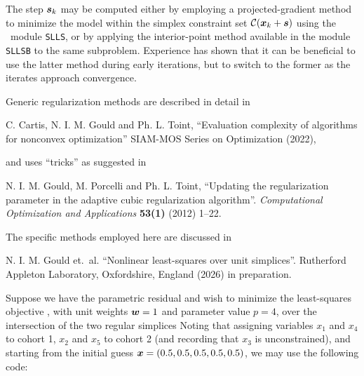 \documentclass{galahad}
\begin{document}
The step ${\bm{s}}_k$ may be computed either by employing a projected-gradient
method to minimize the model within the simplex constraint set 
$\calC(\bmx_k+\bms)$ using the \galahad\ module {\tt SLLS}, or by
applying the interior-point method available in the module {\tt SLLSB}
to the same subproblem. Experience has shown that it can be beneficial
to use the latter method during early iterations, but to switch to the 
former as the iterates approach convergence.

\vspace*{1mm}

\galreferences
\vspace*{1mm}

\noindent
Generic regularization methods are described in detail in
\vspace*{1mm}

\noindent
C. Cartis,  N. I. M. Gould and Ph. L. Toint,
``Evaluation complexity of algorithms for nonconvex optimization''
SIAM-MOS Series on Optimization (2022),
\vspace*{1mm}

\noindent
and uses ``tricks'' as suggested in
\vspace*{1mm}

\noindent
N. I. M. Gould, M. Porcelli and Ph. L. Toint,
``Updating the regularization parameter in the adaptive cubic regularization
algorithm''.
{\em Computational Optimization and Applications}
{\bf 53(1)} (2012) 1--22.

\noindent
The specific methods employed here are discussed in
\vspace*{1mm}

\noindent
N. I. M. Gould et.\ al.
``Nonlinear least-squares over unit simplices''.
Rutherford Appleton Laboratory,
Oxfordshire, England (2026) in preparation.


\galexamples
Suppose we have the parametric residual
and wish to minimize the least-squares objective , with unit weights
${\bm{w}} = 1$ and parameter value $p = 4$, over the intersection of the two
regular simplices
Noting that 
assigning variables $x_1$ and $x_4$ to cohort 1, $x_2$ and $x_5$ to cohort 2
(and recording that $x_3$ is unconstrained), 
and starting from the initial guess ${\bm{x}} = (0.5,0.5,0.5,0.5,0.5)$,
we may use the following code:
\end{document}
